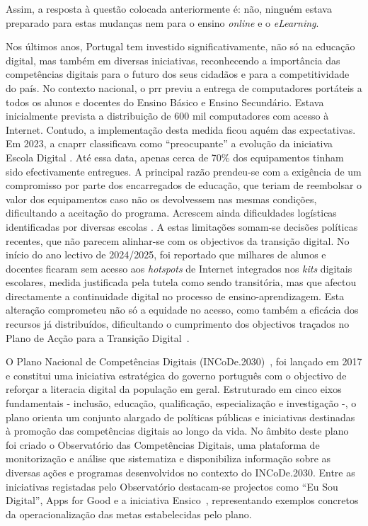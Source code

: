 Assim, a resposta à questão colocada anteriormente é: não, ninguém estava preparado para estas mudanças nem para o ensino \textit{online} e o \textit{eLearning}.

Nos últimos anos, Portugal tem investido significativamente, não só na educação digital, mas também em diversas iniciativas, reconhecendo a importância das competências digitais para o futuro dos seus cidadãos e para a competitividade do país. No contexto nacional, o \acrfull{prr} previu a entrega de computadores portáteis a todos os alunos e docentes do Ensino Básico e Ensino Secundário. Estava inicialmente prevista a distribuição de 600 mil computadores com acesso à Internet. Contudo, a implementação desta medida ficou aquém das expectativas. Em 2023, a \acrfull{cnaprr} classificava como ``preocupante'' a evolução da iniciativa Escola Digital \cite{PRREntregacomputadores}. Até essa data, apenas cerca de 70\% dos equipamentos tinham sido efectivamente entregues. A principal razão prendeu-se com a exigência de um compromisso por parte dos encarregados de educação, que teriam de reembolsar o valor dos equipamentos caso não os devolvessem nas mesmas condições, dificultando a aceitação do programa. Acrescem ainda dificuldades logísticas identificadas por diversas escolas \cite{PRREntregacomputadores}. A estas limitações somam-se decisões políticas recentes, que não parecem alinhar-se com os objectivos da transição digital. No início do ano lectivo de 2024/2025, foi reportado que milhares de alunos e docentes ficaram sem acesso aos \textit{hotspots} de Internet integrados nos \textit{kits} digitais escolares, medida justificada pela tutela como sendo transitória, mas que afectou directamente a continuidade digital no processo de ensino-aprendizagem. Esta alteração comprometeu não só a equidade no acesso, como também a eficácia dos recursos já distribuídos, dificultando o cumprimento dos objectivos traçados no Plano de Acção para a Transição Digital~\cite{ExecutiveDigest2024}.

O Plano Nacional de Competências Digitais (INCoDe.2030)~\cite{incode2030}, foi lançado em 2017 e constitui uma iniciativa estratégica do governo português com o objectivo de reforçar a literacia digital da população em geral. Estruturado em cinco eixos fundamentais - inclusão, educação, qualificação, especialização e investigação -, o plano orienta um conjunto alargado de políticas públicas e iniciativas destinadas à promoção das competências digitais ao longo da vida. No âmbito deste plano foi criado o Observatório das Competências Digitais, uma plataforma de monitorização e análise que sistematiza e disponibiliza informação sobre as diversas ações e programas desenvolvidos no contexto do INCoDe.2030. Entre as iniciativas registadas pelo Observatório destacam-se projectos como ``Eu Sou Digital'', Apps for Good e a iniciativa Ensico~\cite{observatorio2030}, representando exemplos concretos da operacionalização das metas estabelecidas pelo plano.

